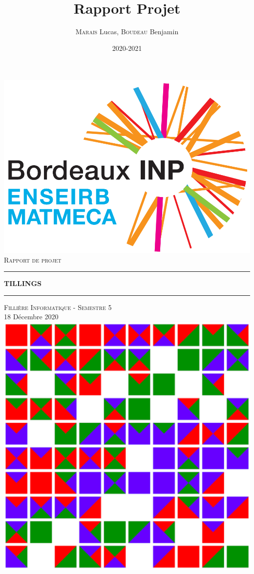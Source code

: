 \documentclass[11pt]{article}
\title{Rapport Projet}
\author{\textsc{Marais} Lucas, \textsc{Boudeau} Benjamin}
\date{2020-2021}
\begin{document}
\begin{titlepage}
\centering
\includegraphics[scale=0.3]{ENSEIRB.png}
\\
\vspace*{1\baselineskip}
\LARGE{\textsc{Rapport de projet}}
\vspace*{0.8\baselineskip}
\rule{1\linewidth}{1pt}

\huge{\textbf{TILLINGS}}
\vspace*{1\baselineskip}
\rule{1\linewidth}{1pt}
\vspace*{1\baselineskip}
\LARGE{\textsc{Fillière Informatique - Semestre 5}}
\\

\large{18 Décembre 2020}
\vspace*{3\baselineskip}
\\
\centering
\includegraphics[scale=0.4]{tillings.png}
\\
\vspace*{4\baselineskip}


\end{titlepage}
\end{document}
